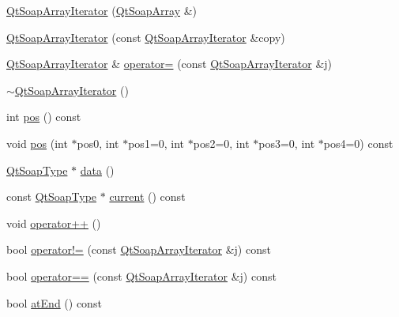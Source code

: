 \begin{DoxyCompactItemize}
\item 
\mbox{\hyperlink{class_qt_soap_array_iterator_a2581a93180335dea22d8c11e232904da}{Qt\+Soap\+Array\+Iterator}} (\mbox{\hyperlink{class_qt_soap_array}{Qt\+Soap\+Array}} \&)
\item 
\mbox{\hyperlink{class_qt_soap_array_iterator_afd6711908a94499bf41501825548db56}{Qt\+Soap\+Array\+Iterator}} (const \mbox{\hyperlink{class_qt_soap_array_iterator}{Qt\+Soap\+Array\+Iterator}} \&copy)
\item 
\mbox{\hyperlink{class_qt_soap_array_iterator}{Qt\+Soap\+Array\+Iterator}} \& \mbox{\hyperlink{class_qt_soap_array_iterator_a58b4799f64a1d6bf971b6cc0536b479e}{operator=}} (const \mbox{\hyperlink{class_qt_soap_array_iterator}{Qt\+Soap\+Array\+Iterator}} \&j)
\item 
\mbox{\hyperlink{class_qt_soap_array_iterator_a3f77d993593062a4af39836d3dde62dd}{$\sim$\+Qt\+Soap\+Array\+Iterator}} ()
\item 
int \mbox{\hyperlink{class_qt_soap_array_iterator_abac3ba397693146abde29bd67608bae1}{pos}} () const
\item 
void \mbox{\hyperlink{class_qt_soap_array_iterator_af6e6e7373d176127dd734cb4c19c5fdb}{pos}} (int $\ast$pos0, int $\ast$pos1=0, int $\ast$pos2=0, int $\ast$pos3=0, int $\ast$pos4=0) const
\item 
\mbox{\hyperlink{class_qt_soap_type}{Qt\+Soap\+Type}} $\ast$ \mbox{\hyperlink{class_qt_soap_array_iterator_aaf9f8f6b2c10867889f18f5ca7f2f379}{data}} ()
\item 
const \mbox{\hyperlink{class_qt_soap_type}{Qt\+Soap\+Type}} $\ast$ \mbox{\hyperlink{class_qt_soap_array_iterator_a7c7a7589b11e80117564e0a4191a6f7e}{current}} () const
\item 
void \mbox{\hyperlink{class_qt_soap_array_iterator_aa3023e339b754a23f908b734e450310c}{operator++}} ()
\item 
bool \mbox{\hyperlink{class_qt_soap_array_iterator_a02fd0f2e5c0a87405b6c8ce4455579e5}{operator!=}} (const \mbox{\hyperlink{class_qt_soap_array_iterator}{Qt\+Soap\+Array\+Iterator}} \&j) const
\item 
bool \mbox{\hyperlink{class_qt_soap_array_iterator_ad3ef98056c1f81043e9ca5aff14cec1f}{operator==}} (const \mbox{\hyperlink{class_qt_soap_array_iterator}{Qt\+Soap\+Array\+Iterator}} \&j) const
\item 
bool \mbox{\hyperlink{class_qt_soap_array_iterator_af74296777226aacd505b7969ad4e7e54}{at\+End}} () const
\end{DoxyCompactItemize}



